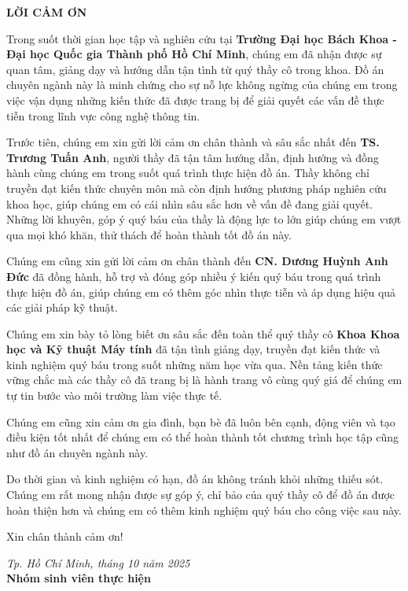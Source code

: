 \thispagestyle{empty} %

\noindent
\vspace{0.2cm}
\begin{center}
    \textbf{\LARGE LỜI CẢM ƠN}
\end{center}
\vspace{1cm} %


Trong suốt thời gian học tập và nghiên cứu tại \textbf{Trường Đại học Bách Khoa - Đại học Quốc gia Thành phố Hồ Chí Minh}, chúng em đã nhận được sự quan tâm, giảng dạy và hướng dẫn tận tình từ quý thầy cô trong khoa. Đồ án chuyên ngành này là minh chứng cho sự nỗ lực không ngừng của chúng em trong việc vận dụng những kiến thức đã được trang bị để giải quyết các vấn đề thực tiễn trong lĩnh vực công nghệ thông tin.

Trước tiên, chúng em xin gửi lời cảm ơn chân thành và sâu sắc nhất đến \textbf{TS. Trương Tuấn Anh}, người thầy đã tận tâm hướng dẫn, định hướng và đồng hành cùng chúng em trong suốt quá trình thực hiện đồ án. Thầy không chỉ truyền đạt kiến thức chuyên môn mà còn định hướng phương pháp nghiên cứu khoa học, giúp chúng em có cái nhìn sâu sắc hơn về vấn đề đang giải quyết. Những lời khuyên, góp ý quý báu của thầy là động lực to lớn giúp chúng em vượt qua mọi khó khăn, thử thách để hoàn thành tốt đồ án này.

Chúng em cũng xin gửi lời cảm ơn chân thành đến \textbf{CN. Dương Huỳnh Anh Đức} đã đồng hành, hỗ trợ và đóng góp nhiều ý kiến quý báu trong quá trình thực hiện đồ án, giúp chúng em có thêm góc nhìn thực tiễn và áp dụng hiệu quả các giải pháp kỹ thuật.

Chúng em xin bày tỏ lòng biết ơn sâu sắc đến toàn thể quý thầy cô \textbf{Khoa Khoa học và Kỹ thuật Máy tính} đã tận tình giảng dạy, truyền đạt kiến thức và kinh nghiệm quý báu trong suốt những năm học vừa qua. Nền tảng kiến thức vững chắc mà các thầy cô đã trang bị là hành trang vô cùng quý giá để chúng em tự tin bước vào môi trường làm việc thực tế.

Chúng em cũng xin cảm ơn gia đình, bạn bè đã luôn bên cạnh, động viên và tạo điều kiện tốt nhất để chúng em có thể hoàn thành tốt chương trình học tập cũng như đồ án chuyên ngành này.

Do thời gian và kinh nghiệm có hạn, đồ án không tránh khỏi những thiếu sót. Chúng em rất mong nhận được sự góp ý, chỉ bảo của quý thầy cô để đồ án được hoàn thiện hơn và chúng em có thêm kinh nghiệm quý báu cho công việc sau này.

Xin chân thành cảm ơn!

\vspace{1.5cm}
\begin{flushright}
    \textit{Tp. Hồ Chí Minh, tháng 10 năm 2025} \\
    \vspace{0.2cm}
    \textbf{Nhóm sinh viên thực hiện}
\end{flushright}